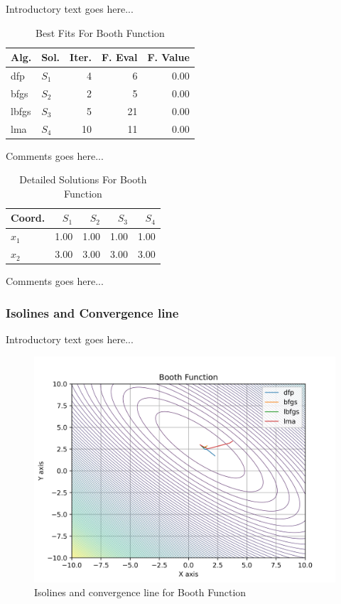 \documentclass{ieeeaccess}
\begin{document}
Introductory text goes here...
\begin{table}
\centering
\caption{Best Fits For Booth Function}
\label{solutions:booth}
\begin{tabular}{llrrr}
\toprule
 Alg. &    Sol. &  Iter. &  F. Eval &  F. Value \\
\midrule
  dfp & $S_{1}$ &      4 &        6 &      0.00 \\
 bfgs & $S_{2}$ &      2 &        5 &      0.00 \\
lbfgs & $S_{3}$ &      5 &       21 &      0.00 \\
  lma & $S_{4}$ &     10 &       11 &      0.00 \\
\bottomrule
\end{tabular}
\end{table}


Comments goes here...
\begin{table}
\centering
\caption{Detailed Solutions For Booth Function}
\label{detailedsolutions:booth}
\begin{tabular}{lrrrr}
\toprule
 Coord. &  $S_{1}$ &  $S_{2}$ &  $S_{3}$ &  $S_{4}$ \\
\midrule
$x_{1}$ &     1.00 &     1.00 &     1.00 &     1.00 \\
$x_{2}$ &     3.00 &     3.00 &     3.00 &     3.00 \\
\bottomrule
\end{tabular}
\end{table}


Comments goes here...
\subsubsection{Isolines and Convergence line}
\label{isolinesbooth2D}


Introductory text goes here...
\begin{figure}[h]
\centering
\includegraphics[scale=0.5]{images/booth.jpg}
\caption{Isolines and convergence line for Booth Function}
\label{fig:booth}
\end{figure}
\end{document}

